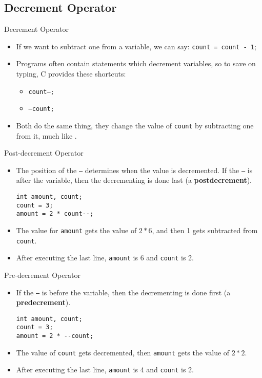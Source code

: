 \documentclass[graphics]{beamer}
\begin{document}
\subsection{Decrement Operator}
\begin{frame}{Decrement Operator}
    \begin{itemize}
        \item If we want to subtract one from a variable, we can say: \texttt{count = count - 1};
        \item Programs often contain statements which decrement variables, so to save on typing, C provides these shortcuts:
        \begin{itemize}
            \item \texttt{count--;}
            \item \texttt{--count;}
        \end{itemize}
        \item Both do the same thing, they change the value of \texttt{count} by subtracting one from it, much like \text{++}.
    \end{itemize}
\end{frame}

\begin{frame}[fragile]{Post-decrement Operator}
    \begin{itemize}
        \item The position of the \texttt{--} determines when the value is decremented. If the \texttt{--} is after the variable, then the decrementing is done last (a \textbf{postdecrement}).
\begin{verbatim}
int amount, count;
count = 3;
amount = 2 * count--;
\end{verbatim}
        \item The value for \texttt{amount} gets the value of $2 * 6$, and then 1 gets subtracted from \texttt{count}.
        \item After executing the last line, \texttt{amount} is 6 and \texttt{count} is 2.
    \end{itemize}
\end{frame}

\begin{frame}[fragile]{Pre-decrement Operator}
    \begin{itemize}
        \item If the \texttt{--} is before the variable, then the decrementing is done first (a \textbf{predecrement}).
        \begin{verbatim}
int amount, count;
count = 3;
amount = 2 * --count;
        \end{verbatim}
        \item The value of \texttt{count} gets decremented, then \texttt{amount} gets the value of $2 * 2$.
        \item After executing the last line, \texttt{amount} is 4 and \texttt{count} is 2.
    \end{itemize}
\end{frame}
\end{document}
